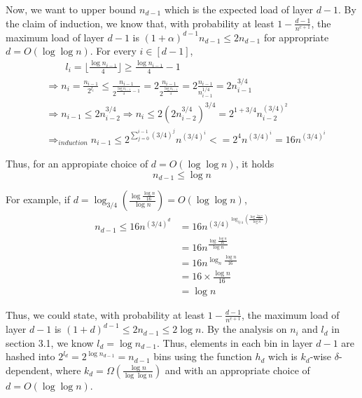 \documentclass[a4paper, english]{paper}
\begin{document}
Now, we want to upper bound $n_{d-1}$ which is the expected load of layer $d-1$. By the claim of induction, we know that, with probability at least $1-\frac{d-1}{n^{c+1}}$, the maximum load of layer $d-1$ is $(1+\alpha)^{d-1}n_{d-1}\le2n_{d-1}$ for appropriate $d=O(\log\log n)$. For every $i\in[d-1]$, 
\begin{align*}
&\qquad l_i =\lfloor\frac{\log n_{i-1}}4\rfloor \ge \frac{\log n_{i-1}}4 -1\\
&\Rightarrow n_i = \frac{n_{i-1}}{2^{l_i}}\le \frac{n_{i-1}}{2^{\frac{\log n_{i-1}}4 -1}} = 2\frac{n_{i-1}}{2^{\frac{\log n_{i-1}}4}}=2\frac{n_{i-1}}{n_{i-1}^{1/4}}= 2 n_{i-1}^{3/4}\\
&\Rightarrow n_{i-1}\le 2 n_{i-2}^{3/4}\Rightarrow n_i\le 2 (2 n_{i-2}^{3/4})^{3/4}=2^{1+3/4}n_{i-2}^{(3/4)^2}\\
&\Rightarrow_{induction} n_{i-1}\le 2^{\sum_{j=0}^{i-1}(3/4)^j}n^{(3/4)^i}<=2^4n^{(3/4)^i}=16n^{(3/4)^i}
\end{align*}\par
 Thus, for an appropiate choice of $d = O(\log\log n)$, it holds $$n_{d-1}\le \log n$$\par
 For example, if $d = \log_{3/4}\left( \frac{\log \frac{\log n}{16}}{\log n}\right)=O(\log\log n)$,
\begin{align*}
n_{d-1}\le16n^{(3/4)^d}&=16n^{(3/4)^{\log_{3/4}\left( \frac{\log \frac{\log n}{16}}{\log n}\right)}}\\
&= 16n^{\frac{\log \frac{\log n}{16}}{\log n}}\\
&= 16n^{\log_n \frac{\log n}{16}}\\
&= 16\times\frac{\log n}{16}\\
&= \log n
\end{align*}\par
Thus, we could state, with probability at least $1-\frac{d-1}{n^{c+1}}$, the maximum load of layer $d-1$ is $(1+d)^{d-1}\le2n_{d-1}\le2\log n$. By the analysis on $n_i$ and $l_d$ in section 3.1, we know $l_d = \log n_{d-1}$. Thus, elements in each bin in layer $d-1$ are hashed into $2^{l_d} = 2^{\log n_{d-1}} = n_{d-1}$ bins using the function $h_d$ wich is $k_d$-wise $\delta$-dependent, where $k_d=\Omega(\frac{\log n}{\log\log n})$ and with an appropriate choice of $d=O(\log\log n)$.\\
\end{document}
